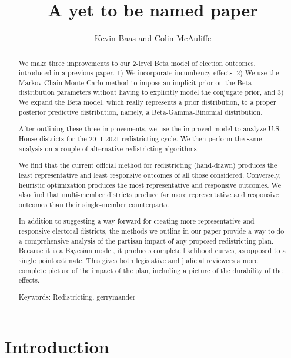 \documentclass[preprint,12pt]{article}
\begin{document}
\title{A yet to be named paper}

\author{Kevin Baas and Colin McAuliffe}

\maketitle

\begin{abstract}
We make three improvements to our 2-level Beta model of election outcomes, introduced in a previous paper.  1) We incorporate incumbency effects. 2) We use the Markov Chain Monte Carlo method to impose an implicit prior on the Beta distribution parameters without having to explicitly model the conjugate prior, and 3) We expand the Beta model, which really represents a prior distribution, to a proper posterior predictive distribution, namely, a Beta-Gamma-Binomial distribution.  

After outlining these three improvements, we use the improved model to analyze U.S. House districts for the 2011-2021 redistricting cycle.  We then perform the same analysis on a couple of alternative redistricting algorithms.

We find that the current official method for redistricting (hand-drawn) produces the least representative and least responsive outcomes of all those considered.  Conversely, heuristic optimization produces the most representative and responsive outcomes.  We also find that multi-member districts produce far more representative and responsive outcomes than their single-member counterparts.

In addition to suggesting a way forward for creating more representative and responsive electoral districts, the methods we outline in our paper provide a way to do a comprehensive analysis of the partisan impact of any proposed redistricting plan.  Because it is a Bayesian model, it produces complete likelihood curves, as opposed to a single point estimate.  This gives both legislative and judicial reviewers a more complete picture of the impact of the plan, including a picture of the durability of the effects.

Keywords: Redistricting, gerrymander 

\end{abstract}

\section{Introduction}
\end{document}
